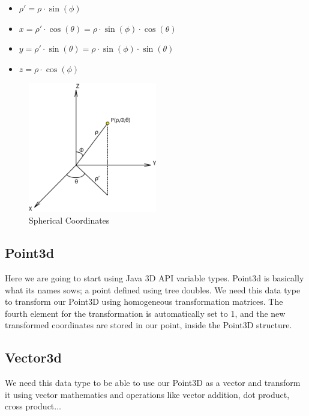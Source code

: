 \documentclass[12pt,a4paper,oneside,english]{book}
\begin{document}
\begin{itemize}
  \item $\rho'=\rho\cdot\sin(\phi)$
  \item $x=\rho'\cdot\cos(\theta)=\rho\cdot\sin(\phi)\cdot\cos(\theta)$
  \item $y=\rho'\cdot\sin(\theta)=\rho\cdot\sin(\phi)\cdot\sin(\theta)$
  \item $z=\rho\cdot\cos(\phi)$
\end{itemize}

\begin{figure}[htbp]
  \begin{center}
    \includegraphics[width=0.50\textwidth]{images/SC.png}
    \caption{Spherical Coordinates}
    \label{spherical coordinates}
  \end{center}
\end{figure}

\newpage

\subsection{Point3d}

Here we are going to start using Java 3D API variable types. Point3d is basically what its names sows; a point defined using tree doubles. We need this data type to transform our Point3D using homogeneous transformation matrices. The fourth element for the transformation is automatically set to 1, and the new transformed coordinates are stored in our point, inside the Point3D structure.

\subsection{Vector3d}

We need this data type to be able to use our Point3D as a vector and transform it using vector mathematics and operations like vector addition, dot product, cross product$\dots$
\end{document}
